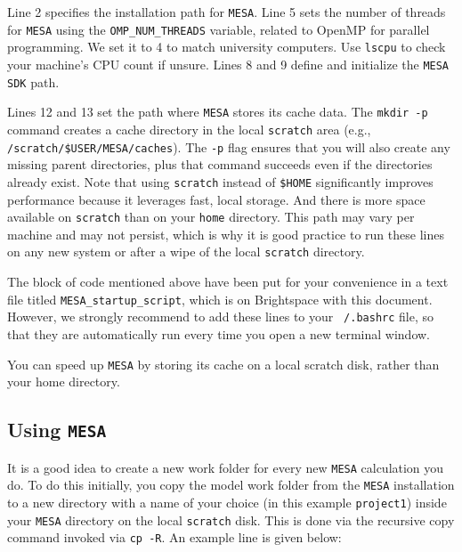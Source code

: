 \documentclass[11pt,a4paper]{article}
\begin{document}
Line 2 specifies the installation path for \texttt{MESA}. 
Line 5 sets the number of threads for \texttt{MESA} using the \texttt{OMP\_NUM\_THREADS} variable, related to OpenMP for parallel programming. We set it to 4 to match university computers. 
Use \texttt{lscpu} to check your machine's CPU count if unsure. 
Lines 8 and 9 define and initialize the \texttt{MESA SDK} path.


Lines 12 and 13 set the path where \texttt{MESA} stores its cache data. 
The \texttt{mkdir -p} command creates a cache directory in the local \texttt{scratch} area (e.g., \texttt{/scratch/\$USER/MESA/caches}). The \texttt{-p} flag ensures that you will also create any missing parent directories, plus that command succeeds even if the directories already exist.
%
Note that using \texttt{scratch} instead of \texttt{\$HOME} significantly improves performance because it leverages fast, local storage. And there is more space available on \texttt{scratch} than on your \texttt{home} directory. This path may vary per machine and may not persist, which is why it is good practice to run these lines on any new system or after a wipe of the local \texttt{scratch} directory.


\bigskip\noindent
The block of code mentioned above have been put for your convenience in a text file titled \texttt{MESA\_startup\_script}, which is on Brightspace with this document. 
However, we strongly recommend to add these lines to your \texttt{~/.bashrc} file, so that they are automatically run every time you open a new terminal window.

\begin{tcolorbox}[protipbox]
You can speed up \texttt{MESA} by storing its cache on a local scratch disk, rather than your home directory.
\end{tcolorbox}



\subsection{Using \texttt{MESA}}

It is a good idea to create a new work folder for every new \texttt{MESA} calculation you do. To do this initially, you copy the model work folder from the \texttt{MESA} installation to a new directory with a name of your choice (in this example \texttt{project1}) inside your \texttt{MESA} directory on the local \texttt{scratch} disk. This is done via the recursive copy command invoked via \texttt{cp -R}. An example line is given below:
\end{document}
